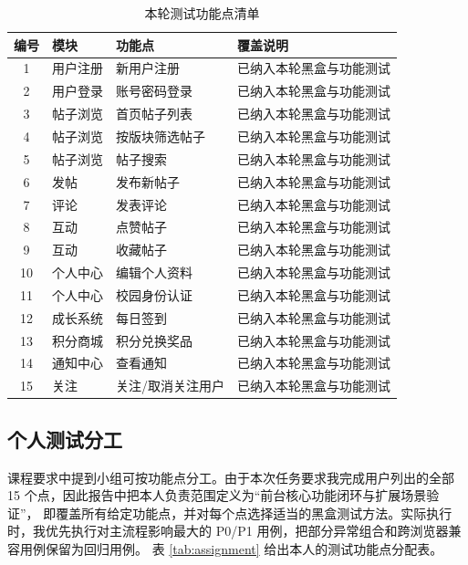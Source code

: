 \documentclass[bwprint]{report}
\begin{document}
\begin{table}[H]
\centering
\caption{本轮测试功能点清单}
\label{tab:function-points}
\begin{tabular}{c p{} p{} p{}}
\toprule
编号 & 模块 & 功能点 & 覆盖说明 \\
\midrule
1 & 用户注册 & 新用户注册 & 已纳入本轮黑盒与功能测试 \\
2 & 用户登录 & 账号密码登录 & 已纳入本轮黑盒与功能测试 \\
3 & 帖子浏览 & 首页帖子列表 & 已纳入本轮黑盒与功能测试 \\
4 & 帖子浏览 & 按版块筛选帖子 & 已纳入本轮黑盒与功能测试 \\
5 & 帖子浏览 & 帖子搜索 & 已纳入本轮黑盒与功能测试 \\
6 & 发帖 & 发布新帖子 & 已纳入本轮黑盒与功能测试 \\
7 & 评论 & 发表评论 & 已纳入本轮黑盒与功能测试 \\
8 & 互动 & 点赞帖子 & 已纳入本轮黑盒与功能测试 \\
9 & 互动 & 收藏帖子 & 已纳入本轮黑盒与功能测试 \\
10 & 个人中心 & 编辑个人资料 & 已纳入本轮黑盒与功能测试 \\
11 & 个人中心 & 校园身份认证 & 已纳入本轮黑盒与功能测试 \\
12 & 成长系统 & 每日签到 & 已纳入本轮黑盒与功能测试 \\
13 & 积分商城 & 积分兑换奖品 & 已纳入本轮黑盒与功能测试 \\
14 & 通知中心 & 查看通知 & 已纳入本轮黑盒与功能测试 \\
15 & 关注 & 关注/取消关注用户 & 已纳入本轮黑盒与功能测试 \\
\bottomrule
\end{tabular}
\end{table}

\subsection{个人测试分工}
课程要求中提到小组可按功能点分工。由于本次任务要求我完成用户列出的全部 15 个点，因此报告中把本人负责范围定义为“前台核心功能闭环与扩展场景验证”，
即覆盖所有给定功能点，并对每个点选择适当的黑盒测试方法。实际执行时，我优先执行对主流程影响最大的 P0/P1 用例，把部分异常组合和跨浏览器兼容用例保留为回归用例。
表 \ref{tab:assignment} 给出本人的测试功能点分配表。
\end{document}

